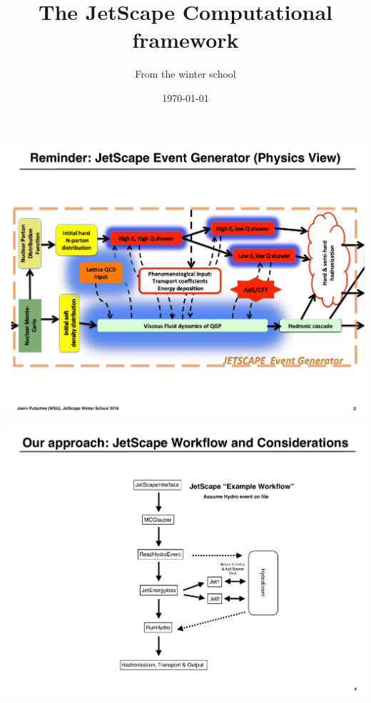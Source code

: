 \documentclass[11pt]{beamer}
\author{From the winter school}
\title{The JetScape Computational framework}
\date{\today}
\begin{document}
\begin{frame}
\titlepage
\end{frame}


\begin{frame}
\begin{center}
\includegraphics[width=\textwidth]{./talks/p3.pdf}
\end{center}
\end{frame}

\begin{frame}
\begin{center}
\includegraphics[width=\textwidth]{./talks/p5.pdf}
\end{center}
\end{frame}
\end{document}
